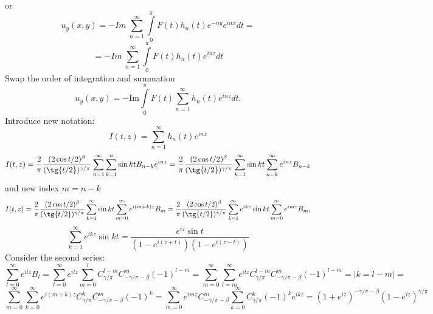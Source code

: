 \documentclass[9pt]{article}
\begin{document}
	or
	\begin{equation*}
		u_y(x,y) = -  Im \ \sum\limits_{n=1}^{\infty}  \int\limits_0^\pi F(t)  h_{n}(t)  e^{-ny} e^{inx} dt =
	\end{equation*}
	\begin{equation*}
		= -  Im \ \sum\limits_{n=1}^{\infty}  \int\limits_0^\pi F(t)  h_{n}(t)  e^{inz}  dt
	\end{equation*}
	Swap the order of integration and summation
	\begin{equation*}
		u_y(x,y)  = -  \mathrm{Im}  \int\limits_0^\pi F(t)  \sum\limits_{n=1}^{\infty}   h_{n}(t)  e^{in z}  dt.
	\end{equation*}
	Introduce new notation:
	\begin{equation*}
		I(t,z) = \sum\limits_{n=1}^{\infty}  h_{n}(t)  e^{in z}
	\end{equation*}
	\begin{equation*}
		I(t,z) =\dfrac{2}{\pi}\dfrac{(2\cos{t/2})^\beta}{(\tg{t/2})^{\gamma/\pi}} \sum\limits_{n=1}^{\infty}   \sum\limits_{k=1}^n \sin{kt} B_{n-k} e^{inz} =
		\dfrac{2}{\pi}\dfrac{(2\cos{t/2})^\beta}{(\tg{t/2})^{\gamma/\pi}} \sum\limits_{k=1}^{\infty} \sin{kt} \sum\limits_{n=k}^{\infty} e^{inz} B_{n-k}
	\end{equation*}
	and new index $m = n - k$
	\begin{equation*}
		I(t,z) = \dfrac{2}{\pi}\dfrac{(2\cos{t/2})^\beta}{(\tg{t/2})^{\gamma/\pi}} \sum\limits_{k=1}^{\infty} \sin{kt} \sum\limits_{m =0 }^{\infty} e^{i(m+k)z} B_{m} =
		\dfrac{2}{\pi}\dfrac{(2\cos{t/2})^\beta}{(\tg{t/2})^{\gamma/\pi}} \sum\limits_{k=1}^{\infty} e^{ikz}\sin{kt} \sum\limits_{m =0 }^{\infty} e^{imz} B_{m},
	\end{equation*}
	\begin{equation*}
		\sum\limits_{k=1}^{\infty} e^{ikz}\sin{kt} =  \dfrac{e^{iz} \sin{t}}{\left(1 - e^{i(z+t)} \right) \left(1 - e^{i(z-t)}\right)}
	\end{equation*}
	Consider the second series:
	\begin{equation*}
		\sum\limits_{l =0 }^{\infty} e^{ilz} B_{l} = \sum\limits_{l =0 }^{\infty} e^{ilz} \sum\limits_{m=0}^{l} C^{l - m}_{\gamma/\pi} C^{m}_{-\gamma/\pi - \beta} (-1)^{l-m} = \sum\limits_{m=0}^{\infty} \sum\limits_{l=m}^{\infty} e^{ilz} C^{l - m}_{\gamma/\pi} C^{m}_{-\gamma/\pi - \beta} (-1)^{l-m} = |k = l - m| =
	\end{equation*}
	\begin{equation*}
		\sum\limits_{m=0}^{\infty} \sum\limits_{k=0}^{\infty} e^{i(m+k)z} C^{k}_{\gamma/\pi} C^{m}_{-\gamma/\pi - \beta} (-1)^{k} = \sum\limits_{m=0}^{\infty} e^{imz} C^{m}_{-\gamma/\pi - \beta} \sum\limits_{k=0}^{\infty}  C^{k}_{\gamma/\pi} (-1)^k e^{ikz} = (1 + e^{iz})^{-\gamma/\pi - \beta} (1- e^{iz})^{\gamma/\pi}
	\end{equation*}
\end{document}
